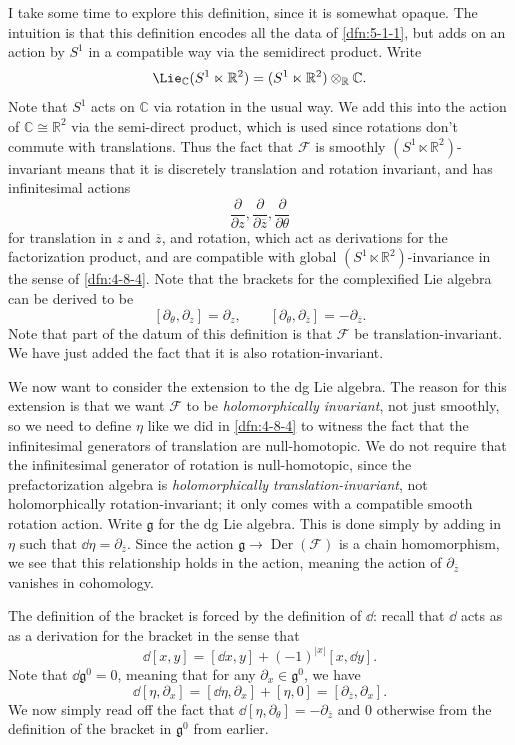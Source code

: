 I take some time to explore this definition, since it is somewhat opaque. The intuition is that this definition encodes all the data of \cref{dfn:5-1-1}, but adds on an action by $S^1$ in a compatible way via the semidirect product. Write
\[
	\Lie _{\mathbb{C} } (S^1\ltimes\mathbb{R} ^2) = (S^1\ltimes\mathbb{R} ^2)\otimes _{\mathbb{R} } \mathbb{C} 
.\]
Note that $S^1$ acts on $\mathbb{C} $ via rotation in the usual way. We add this into the action of $\mathbb{C} \cong \mathbb{R} ^2$ via the semi-direct product, which is used since rotations don't commute with translations. Thus the fact that $\mathcal{F} $ is smoothly $(S^1\ltimes\mathbb{R} ^2)$-invariant means that it is discretely translation and rotation invariant, and has infinitesimal actions
\[
	\frac{\partial }{\partial z} , \frac{\partial }{\partial \overline{z} } , \frac{\partial }{\partial \theta } 
\]
for translation in $z$ and $\overline{z} $, and rotation, which act as derivations for the factorization product, and are compatible with global $(S^1\ltimes\mathbb{R} ^2)$-invariance in the sense of \cref{dfn:4-8-4}. Note that the brackets for the complexified Lie algebra can be derived to be
\[
	[\partial _\theta ,\partial _z] = \partial _z,\qquad [\partial _\theta ,\partial _{\overline{z} } ]=-\partial _{\overline{z} } 
.\]
Note that part of the datum of this definition is that $\mathcal{F} $ be translation-invariant. We have just added the fact that it is also rotation-invariant.

We now want to consider the extension to the dg Lie algebra. The reason for this extension is that we want $\mathcal{F} $ to be \emph{holomorphically invariant}, not just smoothly, so we need to define $\eta $ like we did in \cref{dfn:4-8-4} to witness the fact that the infinitesimal generators of translation are null-homotopic. We do not require that the infinitesimal generator of rotation is null-homotopic, since the prefactorization algebra is \emph{holomorphically translation-invariant}, not holomorphically rotation-invariant; it only comes with a compatible smooth rotation action. Write $\mathfrak{g} $ for the dg Lie algebra. This is done simply by adding in $\eta $ such that $\dd \eta =\partial _{\overline{z} } $. Since the action $\mathfrak{g} \to \operatorname{Der} (\mathcal{F} )$ is a chain homomorphism, we see that this relationship holds in the action, meaning the action of $\partial _{\overline{z} } $ vanishes in cohomology.

The definition of the bracket is forced by the definition of $\dd $: recall that $\dd $ acts as as a derivation for the bracket in the sense that
\[
	\dd [x,y] = [\dd x,y] + (-1)^{\left| x \right| } [x,\dd y]
.\]
Note that $\dd \mathfrak{g} ^0=0$, meaning that for any $\partial_x\in \mathfrak{g} ^0$, we have
\[
	\dd [\eta ,\partial _x] = [\dd \eta ,\partial _x] + [\eta ,0] = [\partial_{\overline{z} } ,\partial _x]
.\]
We now simply read off the fact that $\dd [\eta ,\partial _{\theta } ]=-\partial _{\overline{z} } $ and 0 otherwise from the definition of the bracket in $\mathfrak{g} ^0$ from earlier.

